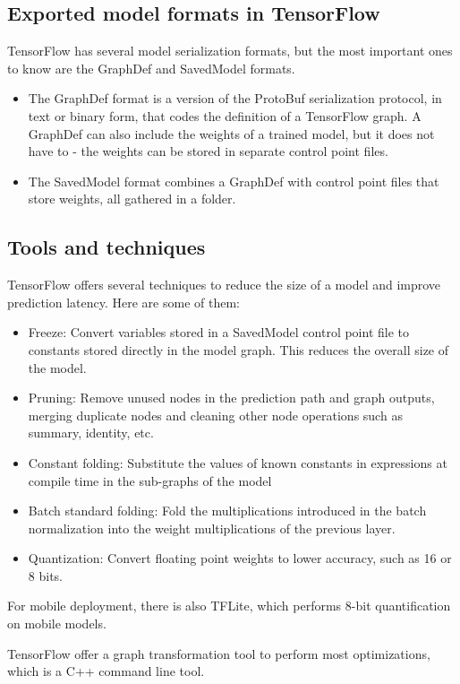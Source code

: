 \subsection{Exported model formats in TensorFlow}
TensorFlow has several model serialization formats, but the most important ones to know are the GraphDef and SavedModel formats. 
\begin{itemize}
    \item The GraphDef format is a version of the ProtoBuf\cite{protobuf} serialization protocol, in text or binary form, that codes the definition of a TensorFlow graph. A GraphDef can also include the weights of a trained model, but it does not have to - the weights can be stored in separate control point files. 
    \item The SavedModel format combines a GraphDef with control point files that store weights, all gathered in a folder.
\end{itemize}


\subsection{Tools and techniques}
TensorFlow offers several techniques to reduce the size of a model and improve prediction latency.
Here are some of them:

\begin{itemize}
    \item Freeze: Convert variables stored in a SavedModel control point file to constants stored directly in the model graph. This reduces the overall size of the model.
    \item Pruning: Remove unused nodes in the prediction path and graph outputs, merging duplicate nodes and cleaning other node operations such as summary, identity, etc.
    \item Constant folding: Substitute the values of known constants in expressions at compile time in the sub-graphs of the model
    \item Batch standard folding: Fold the multiplications introduced in the batch normalization into the weight multiplications of the previous layer.
    \item Quantization: Convert floating point weights to lower accuracy, such as 16 or 8 bits.
\end{itemize}

For mobile deployment, there is also TFLite, which performs 8-bit quantification on mobile models.

TensorFlow offer a graph transformation tool to perform most optimizations, which is a C++ command line tool.

